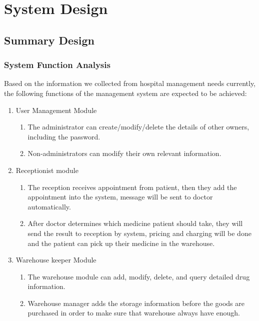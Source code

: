 \section{System Design}
\subsection{Summary Design}
\subsubsection{System Function Analysis}

Based on the information we collected from hospital management needs currently, the following functions of the management system are expected to be achieved:
\begin{enumerate}
    \item User Management Module
    \begin{enumerate}
        \item The administrator can create/modify/delete the details of other owners, including the password.
        \item Non-administrators can modify their own relevant information.

    \end{enumerate}
    \item Receptionist module
    \begin{enumerate}
        \item The reception receives appointment from patient, then they add the appointment into the system, message will be sent to doctor automatically.
        \item After doctor determines which medicine patient should take, they will send the result to reception by system, pricing and charging will be done and the patient can pick up their medicine in the warehouse.
    \end{enumerate}
    \item Warehouse keeper Module
    \begin{enumerate}
        \item The warehouse module can add, modify, delete, and query detailed drug information.
        \item Warehouse manager adds the storage information before the goods are purchased in order to make sure that warehouse always have enough.
    \end{enumerate}
\end{enumerate}

